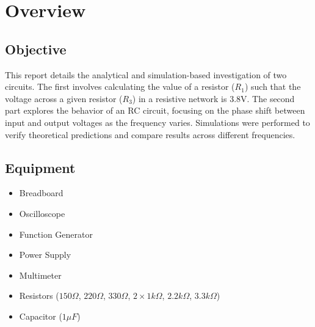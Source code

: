 \chapter{Overview}

\section{Objective}
This report details the analytical and simulation-based investigation of two circuits. The first involves calculating the value of a resistor ($R_1$) such that the voltage across a given resistor ($R_3$) in a resistive network is 3.8V. The second part explores the behavior of an RC circuit, focusing on the phase shift between input and output voltages as the frequency varies. Simulations were performed to verify theoretical predictions and compare results across different frequencies.


\section{Equipment}
\begin{itemize}
    \item Breadboard
    \item Oscilloscope
    \item Function Generator
    \item Power Supply
    \item Multimeter
    \item Resistors ($150\Omega$, $220\Omega$, $330\Omega$, $2\times 1k\Omega$, $2.2k\Omega$, $3.3k\Omega$)
    \item Capacitor ($1\mu F$)
\end{itemize}
